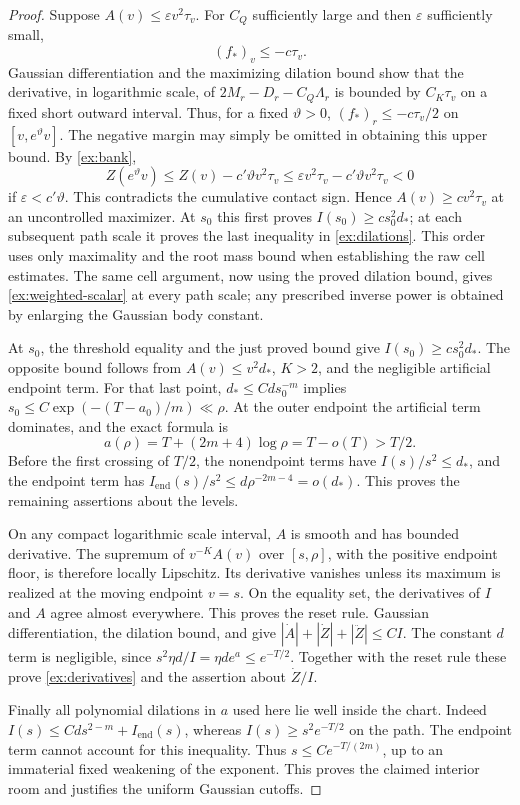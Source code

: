 \begin{proof}
Suppose \(A(v)\le\varepsilon v^2\tau_v\). For \(C_Q\) sufficiently
large and then \(\varepsilon\) sufficiently small,
\[
 (f_*)_v\le-c\tau_v.
\]
Gaussian differentiation and the maximizing dilation bound show
that the derivative, in logarithmic scale, of
\(2M_r-D_r-C_Q\Lambda_r\) is bounded by \(C_K\tau_v\) on a fixed
short outward interval. Thus, for a fixed \(\vartheta>0\),
\((f_*)_r\le-c\tau_v/2\) on \([v,e^\vartheta v]\).
The negative margin may simply be omitted in obtaining this upper
bound. By \eqref{ex:bank},
\[
 Z(e^\vartheta v)
 \le Z(v)-c'\vartheta v^2\tau_v
 \le \varepsilon v^2\tau_v-c'\vartheta v^2\tau_v<0
\]
if \(\varepsilon<c'\vartheta\). This contradicts the cumulative
contact sign. Hence \(A(v)\ge c v^2\tau_v\) at an uncontrolled
maximizer. At \(s_0\) this first proves
\(I(s_0)\ge c s_0^2d_*\); at each subsequent path scale it
proves the last inequality in \eqref{ex:dilations}. This order uses
only maximality and the root mass bound when establishing the raw
cell estimates. The same cell argument, now using the proved
dilation bound, gives \eqref{ex:weighted-scalar} at every path
scale; any prescribed inverse power is obtained by enlarging the
Gaussian body constant.

At \(s_0\), the threshold equality and the just proved bound give
\(I(s_0)\ge c s_0^2d_*\). The opposite bound follows from
\(A(v)\le v^2d_*\), \(K>2\), and the negligible artificial
endpoint term. For that last point,
\(d_*\le Cd s_0^{-m}\) implies
\(s_0\le C\exp(-(T-a_0)/m)\ll\rho\).
At the outer endpoint the artificial term dominates, and the exact
formula is
\[
 a(\rho)=T+(2m+4)\log\rho=T-o(T)>T/2.
\]
Before the first crossing of \(T/2\), the nonendpoint terms have
\(I(s)/s^2\le d_*\), and the endpoint term has
\(I_{\mathrm{end}}(s)/s^2\le d\rho^{-2m-4}=o(d_*)\).
This proves the remaining assertions about the levels.

On any compact logarithmic scale interval, \(A\) is smooth and has
bounded derivative. The supremum of
\(v^{-K}A(v)\) over \([s,\rho]\), with the positive endpoint floor,
is therefore locally Lipschitz. Its derivative vanishes unless its
maximum is realized at the moving endpoint \(v=s\). On the equality
set, the derivatives of \(I\) and \(A\) agree almost everywhere.
This proves the reset rule. Gaussian differentiation, the dilation
bound, and  give
\(|\dot A|+|\dot Z|+|\ddot Z|\le CI\). The constant \(d\) term
is negligible, since \(s^2\eta d/I=\eta d e^a\le e^{-T/2}\).
Together with the reset rule these prove \eqref{ex:derivatives}
and the assertion about \(\dot Z/I\).

Finally all polynomial dilations in \(a\) used here lie well inside
the chart. Indeed
\(I(s)\le Cd s^{2-m}+I_{\mathrm{end}}(s)\), whereas
\(I(s)\ge s^2e^{-T/2}\) on the path. The endpoint term cannot
account for this inequality. Thus \(s\le Ce^{-T/(2m)}\), up to
an immaterial fixed weakening of the exponent. This proves the
claimed interior room and justifies the uniform Gaussian cutoffs.
\end{proof}

